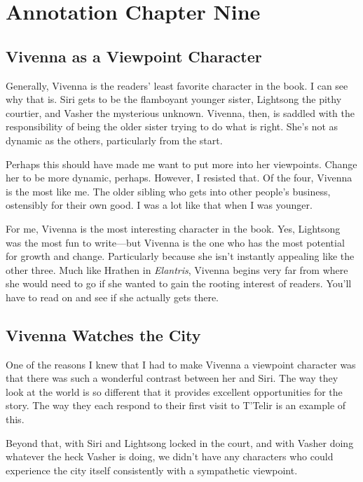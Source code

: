 \section{Annotation Chapter Nine}

\subsection*{Vivenna as a Viewpoint Character}

Generally, Vivenna is the readers’ least favorite character in the book. I can see why that is. Siri gets to be the flamboyant younger sister, Lightsong the pithy courtier, and Vasher the mysterious unknown. Vivenna, then, is saddled with the responsibility of being the older sister trying to do what is right. She’s not as dynamic as the others, particularly from the start.

Perhaps this should have made me want to put more into her viewpoints. Change her to be more dynamic, perhaps. However, I resisted that. Of the four, Vivenna is the most like me. The older sibling who gets into other people’s business, ostensibly for their own good. I was a lot like that when I was younger.

For me, Vivenna is the most interesting character in the book. Yes, Lightsong was the most fun to write—but Vivenna is the one who has the most potential for growth and change. Particularly because she isn’t instantly appealing like the other three. Much like Hrathen in \textit{Elantris}, Vivenna begins very far from where she would need to go if she wanted to gain the rooting interest of readers. You’ll have to read on and see if she actually gets there.

\subsection*{Vivenna Watches the City}

One of the reasons I knew that I had to make Vivenna a viewpoint character was that there was such a wonderful contrast between her and Siri. The way they look at the world is so different that it provides excellent opportunities for the story. The way they each respond to their first visit to T’Telir is an example of this.

Beyond that, with Siri and Lightsong locked in the court, and with Vasher doing whatever the heck Vasher is doing, we didn’t have any characters who could experience the city itself consistently with a sympathetic viewpoint.

